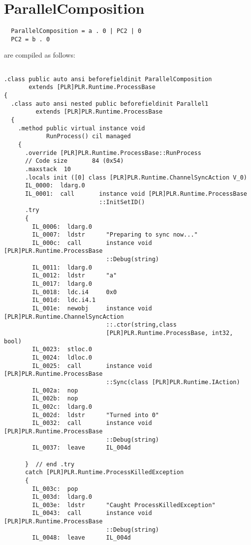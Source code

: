 \section{ParallelComposition}

	\begin{verbatim}
  ParallelComposition = a . 0 | PC2 | 0 
  PC2 = b . 0
	\end{verbatim}
	
	are compiled as follows:

\begin{lstlisting}

.class public auto ansi beforefieldinit ParallelComposition
       extends [PLR]PLR.Runtime.ProcessBase
{
  .class auto ansi nested public beforefieldinit Parallel1
         extends [PLR]PLR.Runtime.ProcessBase
  {
    .method public virtual instance void 
            RunProcess() cil managed
    {
      .override [PLR]PLR.Runtime.ProcessBase::RunProcess
      // Code size       84 (0x54)
      .maxstack  10
      .locals init ([0] class [PLR]PLR.Runtime.ChannelSyncAction V_0)
      IL_0000:  ldarg.0
      IL_0001:  call       instance void [PLR]PLR.Runtime.ProcessBase
                           ::InitSetID()
      .try
      {
        IL_0006:  ldarg.0
        IL_0007:  ldstr      "Preparing to sync now..."
        IL_000c:  call       instance void [PLR]PLR.Runtime.ProcessBase
                             ::Debug(string)
        IL_0011:  ldarg.0
        IL_0012:  ldstr      "a"
        IL_0017:  ldarg.0
        IL_0018:  ldc.i4     0x0
        IL_001d:  ldc.i4.1
        IL_001e:  newobj     instance void [PLR]PLR.Runtime.ChannelSyncAction
                             ::.ctor(string,class 
                             [PLR]PLR.Runtime.ProcessBase, int32, bool)
        IL_0023:  stloc.0
        IL_0024:  ldloc.0
        IL_0025:  call       instance void [PLR]PLR.Runtime.ProcessBase
                             ::Sync(class [PLR]PLR.Runtime.IAction)
        IL_002a:  nop
        IL_002b:  nop
        IL_002c:  ldarg.0
        IL_002d:  ldstr      "Turned into 0"
        IL_0032:  call       instance void [PLR]PLR.Runtime.ProcessBase
                             ::Debug(string)
        IL_0037:  leave      IL_004d

      }  // end .try
      catch [PLR]PLR.Runtime.ProcessKilledException 
      {
        IL_003c:  pop
        IL_003d:  ldarg.0
        IL_003e:  ldstr      "Caught ProcessKilledException"
        IL_0043:  call       instance void [PLR]PLR.Runtime.ProcessBase
                             ::Debug(string)
        IL_0048:  leave      IL_004d


\end{lstlisting}
